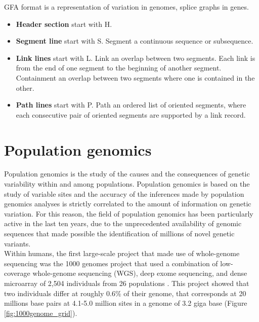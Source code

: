 

GFA format is a representation of variation in genomes, splice graphs in genes.





\begin{itemize}

\item\textbf{Header section} start with H.
\item\textbf{Segment line} start with S.
Segment a continuous sequence or subsequence.
\item\textbf{Link lines} start with L.
Link an overlap between two segments. Each link is from the end of one segment to the beginning of another segment. Containment an overlap between two segments where one is contained in the other.
\item\textbf{Path lines} start with P. 
Path an ordered list of oriented segments, where each consecutive pair of oriented segments are supported by a link record.



\end{itemize}

\section{Population genomics}

Population genomics is the study of the causes and the consequences of genetic variability within and among populations. Population genomics is based on the study of variable sites and the accuracy of the inferences made by population genomics analyses is strictly correlated to the amount of information on genetic variation. For this reason, the field of population genomics has been particularly active in the last ten years, due to the unprecedented availability of genomic sequences that made possible the identification of millions of novel genetic variants. \\ 

Within humans, the first large-scale project that made use of whole-genome sequencing was the 1000 genomes project that used a combination of low-coverage whole-genome sequencing (WGS), deep exome sequencing, and dense microarray of 2,504 individuals from 26 populations \cite{1000genome2015global}. 
This project showed that two individuals differ at roughly  0.6\% of their genome, that corresponds at 20 millions base pairs at 4.1-5.0 million sites in a genome of 3.2 giga base (Figure \ref{fig:1000genome_grid}).\\ 


